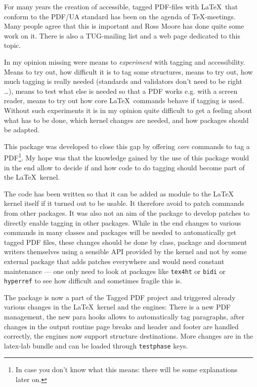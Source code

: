 \documentclass[bibliography=totoc,a4paper]{article}
\newcommand\pkg[1]{\texttt{#1}}
\newcommand\PDF{PDF}
\begin{document}
For many years the creation of accessible, tagged \PDF{}-files with \LaTeX\ 
that conform to the PDF/UA standard has been on the agenda of \TeX-meetings. 
Many people agree that this is important and Ross Moore has done quite some 
work on it. There is also a TUG-mailing list and a web page 
\parencite{tugaccess} dedicated to this topic. 

In my opinion missing were means to \emph{experiment} with tagging and 
accessibility. Means to try out, how difficult it is to tag some structures, 
means to try out, how much tagging is really needed (standards and validators 
don't need to be right \ldots), means to test what else is needed so that a 
\PDF{} works e.g. with a screen reader, means to try out how core \LaTeX\ 
commands behave if tagging is used. Without such experiments it is in my 
opinion quite difficult to get a feeling about what has to be done, which 
kernel changes are needed, and how packages should be adapted. 

This package was developed to close this gap by offering \emph{core} commands 
to tag a \PDF{}\footnote{In case you don't know what this means: there will 
be some explanations later on.}. My hope was that the knowledge gained by the 
use of this package would in the end allow to decide if and how code to do 
tagging should become part of the \LaTeX\ kernel. 


The code has been written so that it can be added as module to the \LaTeX{} 
kernel itself if it turned out to be usable. It therefore avoid to patch 
commands from other packages. It was also not an aim of the package to 
develop patches to directly enable tagging in other packages. While in the end changes to various commands in many 
classes and packages will be needed to automatically get tagged \PDF{} files, these changes 
should be done by class, package and document writers themselves using a 
sensible API provided by the kernel and not by some external package that 
adds patches everywhere and would need constant maintenance --- one only need 
to look at packages like \pkg{tex4ht} or \pkg{bidi} or \pkg{hyperref} to see how difficult and 
sometimes fragile this is. 

The package is now a part of the Tagged PDF project and triggered already 
various changes in the \LaTeX\ kernel and the engines: There is a new PDF 
management, the new para hooks allows to automatically tag paragraphs, after 
changes in the output routine page breaks and header and footer are handled 
correctly, the engines now support structure destinations. More changes are 
in the latex-lab bundle and can be loaded through \texttt{testphase} keys. 
\end{document}
